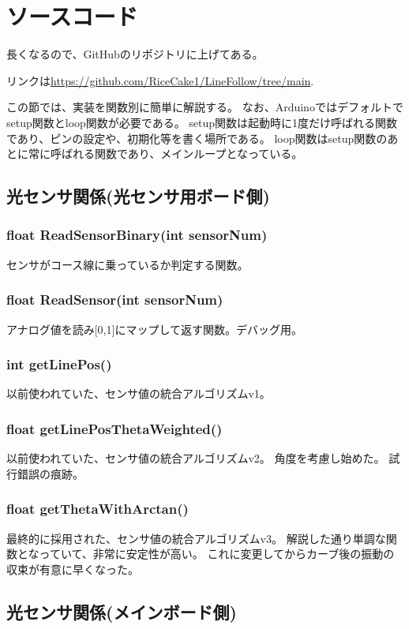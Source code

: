 \documentclass{ltjsreport}
\begin{document}
\section{ソースコード}
長くなるので、GitHubのリポジトリに上げてある。

リンクは\url{https://github.com/RiceCake1/LineFollow/tree/main}.

この節では、実装を関数別に簡単に解説する。
なお、Arduinoではデフォルトでsetup関数とloop関数が必要である。
setup関数は起動時に1度だけ呼ばれる関数であり、ピンの設定や、初期化等を書く場所である。
loop関数はsetup関数のあとに常に呼ばれる関数であり、メインループとなっている。

\subsection{光センサ関係(光センサ用ボード側)}
\subsubsection{float ReadSensorBinary(int sensorNum)}
センサがコース線に乗っているか判定する関数。

\subsubsection{float ReadSensor(int sensorNum)}
アナログ値を読み[0,1]にマップして返す関数。デバッグ用。

\subsubsection{int getLinePos()}
以前使われていた、センサ値の統合アルゴリズムv1。

\subsubsection{float getLinePosThetaWeighted()}
以前使われていた、センサ値の統合アルゴリズムv2。
角度を考慮し始めた。
試行錯誤の痕跡。

\subsubsection{float getThetaWithArctan()}
最終的に採用された、センサ値の統合アルゴリズムv3。
解説した通り単調な関数となっていて、非常に安定性が高い。
これに変更してからカーブ後の振動の収束が有意に早くなった。

\subsection{光センサ関係(メインボード側)}
\end{document}
